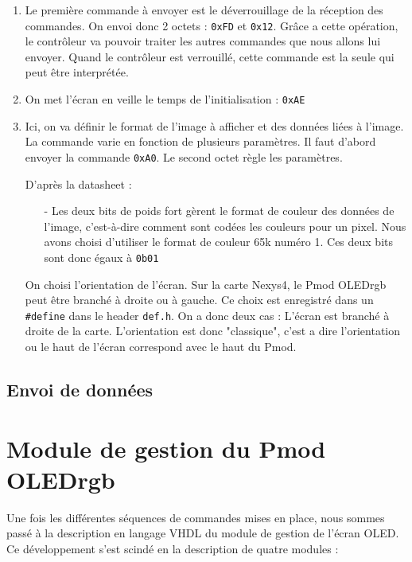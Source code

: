 \documentclass[11pt]{article}
\begin{document}
\begin{enumerate}
    \item Le première commande à envoyer est le déverrouillage de la réception des commandes. On envoi donc 2 octets : \texttt{0xFD} et \texttt{0x12}. Grâce a cette opération, le contrôleur va pouvoir traiter les autres commandes que nous allons lui envoyer. Quand le contrôleur est verrouillé, cette commande est la seule qui peut être interprétée. 

    \item On met l'écran en veille le temps de l'initialisation : \texttt{0xAE}

    \item Ici, on va définir le format de l'image à afficher et des données liées à l'image. La commande varie en fonction de plusieurs paramètres. Il faut d'abord envoyer la commande \texttt{0xA0}. Le second octet règle les paramètres. 

    D'après la datasheet : 
    \begin{itemize}
        \item[-] Les deux bits de poids fort gèrent le format de couleur des données de l'image, c'est-à-dire comment sont codées les couleurs pour un pixel. Nous avons choisi d'utiliser le format de couleur 65k numéro 1. Ces deux bits sont donc égaux à \texttt{0b01}
    \end{itemize}

    On choisi l'orientation de l'écran. Sur la carte Nexys4, le Pmod OLEDrgb peut être branché à droite ou à gauche. Ce choix est enregistré dans un \texttt{\#define} dans le header \texttt{def.h}. On a donc deux cas : 
        \subitem L'écran est branché à droite de la carte. L'orientation est donc "classique", c'est a dire l'orientation ou le haut de l'écran correspond avec le haut du Pmod. 


\end{enumerate}


\subsection{Envoi de données}

\newpage

\section{Module de gestion du Pmod OLEDrgb}

Une fois les différentes séquences de commandes mises en place, nous sommes passé à la description en langage VHDL du module de gestion de l'écran OLED. Ce développement s'est scindé en la description de quatre modules :
\end{document}
